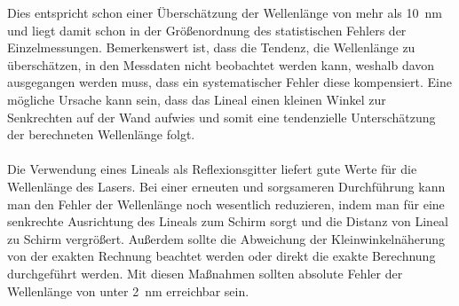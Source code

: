 \documentclass[11pt, a4paper]{article}
\numberwithin{equation}{section}
\begin{document}
Dies entspricht schon einer Überschätzung der Wellenlänge von mehr als \SI{10}{\nano\metre} und liegt damit schon in der Größenordnung des statistischen Fehlers der Einzelmessungen.
Bemerkenswert ist, dass die Tendenz, die Wellenlänge zu überschätzen, in den Messdaten nicht beobachtet werden kann, weshalb davon ausgegangen werden muss, dass ein systematischer Fehler diese kompensiert.
Eine mögliche Ursache kann sein, dass das Lineal einen kleinen Winkel zur Senkrechten auf der Wand aufwies und somit eine tendenzielle Unterschätzung der berechneten Wellenlänge folgt.\\
\\
Die Verwendung eines Lineals als Reflexionsgitter liefert gute Werte für die Wellenlänge des Lasers.
Bei einer erneuten und sorgsameren Durchführung kann man den Fehler der Wellenlänge noch wesentlich reduzieren, indem man für eine senkrechte Ausrichtung des Lineals zum Schirm sorgt und die Distanz von Lineal zu Schirm vergrößert.
Außerdem sollte die Abweichung der Kleinwinkelnäherung von der exakten Rechnung beachtet werden oder direkt die exakte Berechnung durchgeführt werden.
Mit diesen Maßnahmen sollten absolute Fehler der Wellenlänge von unter \SI{2}{\nano\metre} erreichbar sein.
\end{document}
